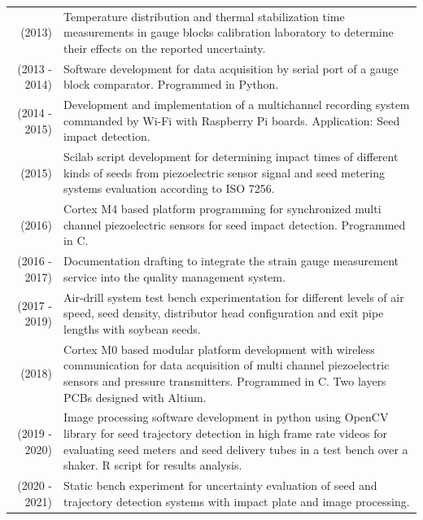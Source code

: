 \documentclass[a4paper,10pt, sans]{article}
\begin{document}
\begin{table}[H]
\begin{tabularx}{\textwidth}{r X}
        (2013) & Temperature distribution and thermal stabilization time measurements in gauge blocks calibration laboratory to determine their effects on the reported uncertainty. \\ [1ex]
        (2013 - 2014) & Software development for data acquisition by serial port of a gauge block comparator. Programmed in Python.\\ [1ex]
        (2014 - 2015) & Development and implementation of a multichannel recording system commanded by Wi-Fi with Raspberry Pi boards. Application: Seed impact detection. \\ [1ex]
        (2015) & Scilab script development for determining impact times of different kinds of seeds from piezoelectric sensor signal and seed metering systems evaluation according to ISO 7256. \\ [1ex]
        (2016) & Cortex M4 based platform programming for synchronized multi channel piezoelectric sensors for seed impact detection. Programmed in C.\\ [1ex]
        (2016 - 2017) & Documentation drafting to integrate the strain gauge measurement service into the quality management system. \\ [1ex]
        (2017 - 2019) & Air-drill system test bench experimentation for different levels of air speed, seed density, distributor head configuration and exit pipe lengths with soybean seeds. \\ [1ex]
        (2018) & Cortex M0 based modular platform development with wireless communication for data acquisition of multi channel piezoelectric sensors and pressure transmitters. Programmed in C. Two layers PCBs designed with Altium.\\ [1ex]
        (2019 - 2020) & Image processing software development in python using OpenCV library for seed trajectory detection in high frame rate videos for evaluating seed meters and seed delivery tubes in a test bench over a shaker. R script for results analysis. \\ [1ex]
        (2020 - 2021) & Static bench experiment for uncertainty evaluation of seed and trajectory detection systems with impact plate and image processing. \\ [1ex]        
        
  \end{tabularx}
  \end{table}
  
\end{document}
